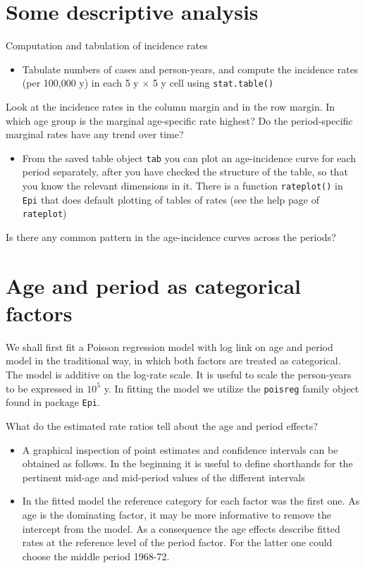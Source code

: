 \documentclass[
]{book}
\providecommand{\tightlist}{%
  \setlength{\itemsep}{0pt}\setlength{\parskip}{0pt}}
\begin{document}
\section{Some descriptive analysis}\label{some-descriptive-analysis}

Computation and tabulation of incidence rates

\begin{itemize}
\tightlist
\item
  Tabulate numbers of cases and person-years, and compute the
  incidence rates (per 100,000 y) in each 5 y \(\times\) 5 y cell using
  \texttt{stat.table()}
\end{itemize}

Look at the incidence rates in the column margin and in the row
margin. In which age group is the marginal age-specific rate highest?
Do the period-specific marginal rates have any trend over time?

\begin{itemize}
\tightlist
\item
  From the saved table object \texttt{tab} you can plot an
  age-incidence curve for each period separately, after you have
  checked the structure of the table, so that you know the relevant
  dimensions in it. There is a function \texttt{rateplot()} in \texttt{Epi}
  that does default plotting of tables of rates (see the help page of
  \texttt{rateplot})
\end{itemize}

Is there any common pattern in the age-incidence curves across the periods?

\section{Age and period as categorical factors}\label{age-and-period-as-categorical-factors}

We shall first fit a Poisson regression model with log link
on age and period model in the traditional way,
in which both factors are treated as categorical.
The model is additive on the log-rate scale.
It is useful to scale the person-years to be expressed in \(10^5\) y.
In fitting the model we utilize the \texttt{poisreg} family object
found in package \texttt{Epi}.

What do the estimated rate ratios tell about the age and period effects?

\begin{itemize}
\item
  A graphical inspection of point estimates and confidence
  intervals can be obtained as follows. In the beginning it is useful
  to define shorthands for the pertinent mid-age and mid-period values
  of the different intervals
\item
  In the fitted model the reference category for each factor was
  the first one. As age is the dominating factor, it may be more
  informative to remove the intercept from the model. As a
  consequence the age effects describe fitted rates at the reference
  level of the period factor. For the latter one could choose the
  middle period 1968-72.
\end{itemize}
\end{document}
